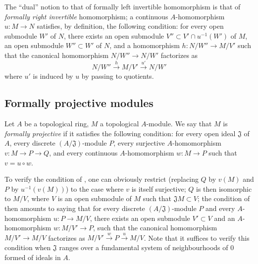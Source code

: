 \begin{remark}[19.1.15]
\label{0.19.1.15}
The ``dual'' notion to that of formally left invertible homomorphism is that of \emph{formally right invertible} homomorphism;
a continuous $A$-homomorphism $u:M\to N$ satisfies, by definition, the following condition:
for every open submodule $W'$ of $N$, there exists an open submodule $V''\subset V'\cap u^{-1}(W')$ of $M$, an open submodule $W''\subset W'$ of $N$, and a homomorphism $h:N/W''\to M/V'$ such that the canonical homomorphism $N/W''\to N/W'$ factorizes as
\[
  N/W''\xrightarrow{h}M/V'\xrightarrow{u'}N/W'
\]
where $u'$ is induced by $u$ by passing to quotients.
\end{remark}

\subsection{Formally projective modules}
\label{subsection:0.19.2}

\begin{definition}[19.2.1]
\label{0.19.2.1}
Let $A$ be a topological ring, $M$ a topological $A$-module.
We say that $M$ is \emph{formally projective} if it satisfies the following condition:
for every open ideal $\mathfrak{J}$ of $A$, every discrete $(A/\mathfrak{J})$-module $P$, every surjective $A$-homomorphism $v:M\to P\to Q$, and every continuous $A$-homomorphism $w:M\to P$ such that $v=u\circ w$.
\end{definition}

\begin{env}[19.2.2]
\label{0.19.2.2}
To verify the condition of , one can obviously restrict (replacing $Q$ by $v(M)$ and $P$ by $u^{-1}(v(M))$) to the case where $v$ is itself surjective;
$Q$ is then isomorphic to $M/V$, where $V$ is an open submodule of $M$ such that $\mathfrak{J}M\subset V$;
the condition of  then amounts to saying that for every discrete $(A/\mathfrak{J})$-module $P$ and every $A$-homomorphism $u:P\to M/V$, there exists an open submodule $V'\subset V$ and an $A$-homomorphism $w:M/V'\to P$, such that the canonical homomorphism $M/V'\to M/V$ factorizes as $M/V'\xrightarrow{w}P\xrightarrow{u}M/V$.
Note that it suffices to verify this condition when $\mathfrak{J}$ ranges over a fundamental system of neighbourhoods of $0$ formed of ideals in $A$.
\end{env}


